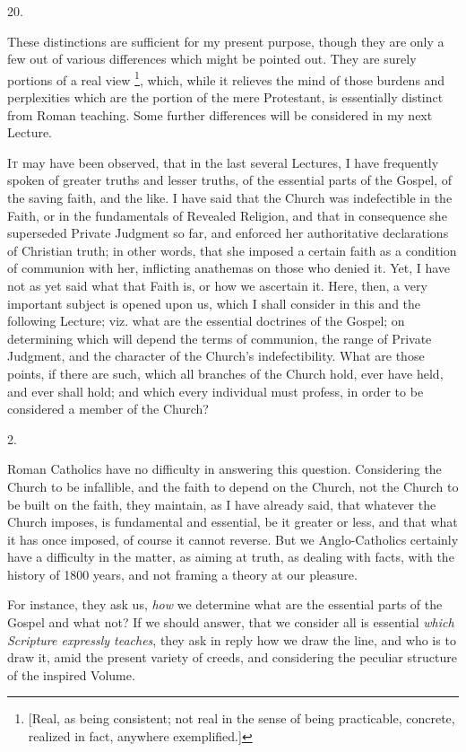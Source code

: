 20.

These distinctions are sufficient for my present purpose, though
they are only a few out of various differences which might be pointed
out. They are surely portions of a real view \footnote{[Real, as being consistent; not real in
the sense of being practicable, concrete, realized in fact, anywhere
exemplified.]}, which, while it relieves the mind of those burdens and
perplexities which are the portion of the mere Protestant, is
essentially distinct from Roman teaching. Some further differences
will be considered in my next Lecture.


I\textsc{t} may have been observed, that in the
last several Lectures, I have frequently spoken of greater truths and
lesser truths, of the essential parts of the Gospel, of the saving
faith, and the like. I have said that the Church was indefectible in
the Faith, or in the fundamentals of Revealed Religion, and that in
consequence she superseded Private Judgment so far, and enforced her
authoritative declarations of Christian truth; in other words, that
she imposed a certain faith as a condition of communion with her,
inflicting anathemas on those who denied it. Yet, I have not as yet
said what that Faith is, or how we ascertain it. Here, then, a very
important subject is opened upon us, which I shall consider in this
and the following Lecture; viz. what are the essential doctrines of
the Gospel; on determining which will depend the terms of communion,
the range of Private Judgment, and the character of the Church's
indefectibility. What are those points, if there are such, which all
branches of the Church hold, ever have held, and ever shall hold; and
which every individual must profess, in order to be considered a
member of the Church?

2.

Roman Catholics have no difficulty in answering this question.
Considering the Church to be infallible, and the faith to depend
on the Church, not the Church to be built on the faith, they maintain,
as I have already said, that whatever the Church imposes, is
fundamental and essential, be it greater or less, and that what it has
once imposed, of course it cannot reverse. But we Anglo-Catholics
certainly have a difficulty in the matter, as aiming at truth, as
dealing with facts, with the history of 1800 years, and not framing a
theory at our pleasure.

For instance, they ask us, \emph{how} we determine what are the
essential parts of the Gospel and what not? If we should answer, that
we consider all is essential \emph{which Scripture expressly teaches},
they ask in reply how we draw the line, and who is to draw it, amid
the present variety of creeds, and considering the peculiar structure
of the inspired Volume.

